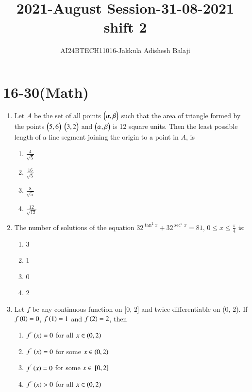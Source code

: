 \documentclass[journal]{IEEEtran}
\begin{document}

\title{2021-August Session-31-08-2021 shift 2}
\author{AI24BTECH11016-Jakkula Adishesh Balaji}
{\let\newpage\relax\maketitle}
\renewcommand{\thefigure}{\theenumi}
\renewcommand{\thetable}{\theenumi}
\setlength{\intextsep}{10pt} %
\renewcommand{\thetable}{\theenumi}
\section{16-30(Math)}
\begin{enumerate}
	\item
	Let $A$ be the set of all points $\begin{pmatrix}\alpha , \beta\end{pmatrix}$ such that the area of triangle formed by the points $\begin{pmatrix}5 , 6\end{pmatrix}$ $\begin{pmatrix}3 , 2\end{pmatrix}$ and $\begin{pmatrix}\alpha , \beta\end{pmatrix}$ is 12 square units. Then the least possible length of a line segment joining the origin to a point in $A$, is 
		\begin{enumerate}
			\item  $\frac{4}{\sqrt{5}}$
			\item  $\frac{16}{\sqrt{5}}$
			\item  $\frac{8}{\sqrt{5}}$
			\item  $\frac{12}{\sqrt{12}}$
		\end{enumerate}
	\item
	The number of solutions of the equation $32^{\tan^{2}{x}} + 32^{\sec^{2}{x}} = 81$, $0 \leq x \leq \frac{\pi}{4}$ is:
		\begin{enumerate}
			\item 3
			\item 1
			\item 0
			\item 2
		\end{enumerate}
	\item 
	Let $f$ be any continuous function on [0, 2] and twice differentiable on (0, 2). If $f\left(0\right) = 0$, $f\left(1\right) = 1$ and $f\left(2\right) = 2$, then
		\begin{enumerate}
			\item  $f^{"}\left(x\right) = 0$ for all $x \in \left(0, 2\right)$
			\item  $f^{"}\left(x\right) = 0$ for some $x \in \left(0, 2\right)$
			\item  $f^{'}\left(x\right) = 0$ for some $x \in {}\left[0, 2\right]$
			\item  $f^{"}\left(x\right) > 0$ for all $x \in \left(0, 2\right)$

\end{enumerate}
\end{enumerate}
\end{document}
